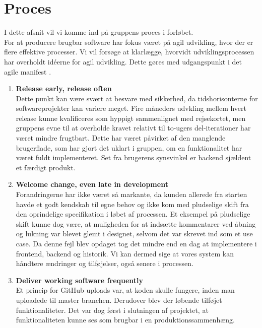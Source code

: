 \documentclass[]{article}
\begin{document}
\section{Proces} \label{Proces} %
I dette afsnit vil vi komme ind på gruppens proces i forløbet. \\
For at producere brugbar software har fokus været på agil udvikling, hvor der er flere effektive processer. Vi vil forsøge at klarlægge, hvorvidt udviklingsprocessen har overholdt idéerne for agil udvikling. Dette gøres med udgangspunkt i det agile manifest \cite{martin2006agile}.
\begin{enumerate}
    \item \textbf{Release early, release often} \\
Dette punkt kan være svært at besvare med sikkerhed, da tidshorisonterne for softwareprojekter kan variere meget. Fire måneders udvkling mellem hvert release kunne kvalificeres som hyppigt sammenlignet med rejsekortet, men gruppens evne til at overholde kravet relativt til to-ugers del-iterationer har været mindre frugtbart. Dette har været påvirket af den manglende brugerflade, som har gjort det uklart i gruppen, om en funktionalitet har været fuldt implementeret. Set fra brugerens synsvinkel er backend sjældent et færdigt produkt.

    \item \textbf{Welcome change, even late in development} \\
Forandringerne har ikke været så markante, da kunden allerede fra starten havde et godt kendskab til egne behov og ikke kom med pludselige skift fra den oprindelige specifikation i løbet af processen. Et eksempel på pludselige skift kunne dog være, at muligheden for at indsætte kommentarer ved åbning og lukning var blevet glemt i designet, selvom det var skrevet ind som et use case. Da denne fejl blev opdaget tog det mindre end en dag at implementere i frontend, backend og historik. Vi kan dermed sige at vores system kan håndtere ændringer og tilføjelser, også senere i processen.

    \item \textbf{Deliver working software frequently} \\
Et princip for GitHub uploads var, at koden skulle fungere, inden man uploadede til master branchen. Derudover blev der løbende tilføjet funktionaliteter. Det var dog først i slutningen af projektet, at funktionaliteten kunne ses som brugbar i en produktionssammenhæng. 
 

\end{enumerate}
\end{document}
